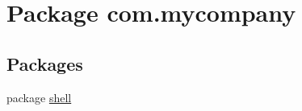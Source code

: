 \hypertarget{namespacecom_1_1mycompany}{}\section{Package com.\+mycompany}
\label{namespacecom_1_1mycompany}
\subsection*{Packages}
\begin{DoxyCompactItemize}
\item 
package \hyperlink{namespacecom_1_1mycompany_1_1shell}{shell}
\end{DoxyCompactItemize}
